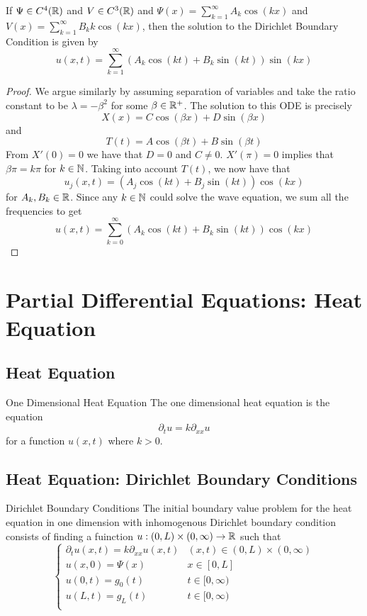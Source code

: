\documentclass[a4paper]{article}
\begin{document}
\begin{prp}{}{} If $\Psi\in C^4(\mathbb{R})$ and $V\in C^3(\mathbb{R})$ and $\Psi(x)=\sum_{k=1}^\infty A_k\cos(kx)$ and $V(x)=\sum_{k=1}^\infty B_kk\cos(kx)$, then the solution to the Dirichlet Boundary Condition is given by $$u(x,t)=\sum_{k=1}^\infty\left(A_k\cos(kt)+B_k\sin(kt)\right)\sin(kx)$$ \tcbline
\begin{proof}
We argue similarly by assuming separation of variables and take the ratio constant to be $\lambda=-\beta^2$ for some $\beta\in\mathbb{R}^+$. The solution to this ODE is precisely $$X(x)=C\cos(\beta x)+D\sin(\beta x)$$ and $$T(t)=A\cos(\beta t)+B\sin(\beta t)$$ From $X'(0)=0$ we have that $D=0$ and $C\neq 0$. $X'(\pi)=0$ implies that $\beta\pi=k\pi$ for $k\in\mathbb{N}$. Taking into account $T(t)$, we now have that $$u_j(x,t)=(A_j\cos(kt)+B_j\sin(kt))\cos(kx)$$ for $A_k,B_k\in\mathbb{R}$. Since any $k\in\mathbb{N}$ could solve the wave equation, we sum all the frequencies to get $$u(x,t)=\sum_{k=0}^\infty(A_k\cos(kt)+B_k\sin(kt))\cos(kx)$$
\end{proof}
\end{prp}

\pagebreak
\section{Partial Differential Equations: Heat Equation}
\subsection{Heat Equation}
\begin{defn}{One Dimensional Heat Equation}{} The one dimensional heat equation is the equation $$\partial_tu=k\partial_{xx}u$$ for a function $u(x,t)$ where $k>0$. 
\end{defn}

\subsection{Heat Equation: Dirichlet Boundary Conditions}
\begin{defn}{Dirichlet Boundary Conditions}{} The initial boundary value problem for the heat equation in one dimension with inhomogenous Dirichlet boundary condition consists of finding a fuinction $u:(0,L)\times(0,\infty)\to\mathbb{R}$ such that $$\begin{cases}
\partial_{t}u(x,t)=k\partial_{xx}u(x,t) & (x,t)\in(0,L)\times(0,\infty)\\
u(x,0)=\Psi(x) & x\in[0,L]\\
u(0,t)=g_0(t) & t\in[0,\infty)\\
u(L,t)=g_L(t) & t\in[0,\infty)\\
\end{cases}$$
\end{defn}
\end{document}
